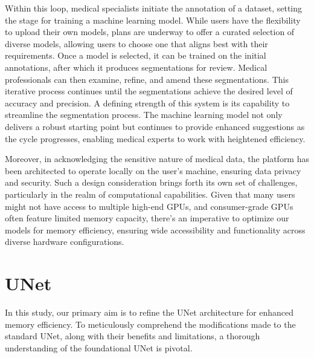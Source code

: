 \noindent Within this loop, medical specialists initiate the annotation of a dataset, setting the stage for training a machine learning model. While users have the flexibility to upload their own models,
plans are underway to offer a curated selection of diverse models, allowing users to choose one that aligns best with their requirements. Once a model is selected, it can be trained on the initial
annotations, after which it produces segmentations for review. Medical professionals can then examine, refine, and amend these segmentations.
This iterative process continues until the segmentations achieve the desired level of accuracy and precision. A defining strength of this system is its capability to streamline the segmentation process.
The machine learning model not only delivers a robust starting point but continues to provide enhanced suggestions as the cycle progresses, enabling medical experts to work with heightened efficiency.

\noindent Moreover, in acknowledging the sensitive nature of medical data, the platform has been architected to operate locally on the user's machine, ensuring data privacy and security.
Such a design consideration brings forth its own set of challenges, particularly in the realm of computational capabilities.
Given that many users might not have access to multiple high-end GPUs, and consumer-grade GPUs often feature limited memory capacity,
there's an imperative to optimize our models for memory efficiency, ensuring wide accessibility and functionality across diverse hardware configurations.

\section{UNet}
In this study, our primary aim is to refine the UNet architecture for enhanced memory efficiency. To meticulously comprehend the modifications made to the standard UNet,
along with their benefits and limitations, a thorough understanding of the foundational UNet is pivotal.

